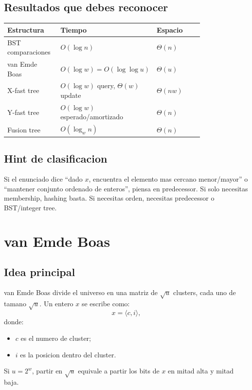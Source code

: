 \documentclass[10pt]{article}
\newcommand{\bigO}{O}
\begin{document}
\subsection{Resultados que debes reconocer}
\begin{center}
\begin{tabular}{p{0.28\linewidth}p{0.24\linewidth}p{0.28\linewidth}}
\toprule
Estructura & Tiempo & Espacio \\
\midrule
BST comparaciones & $\bigO(\log n)$ & $\Theta(n)$ \\
van Emde Boas & $\bigO(\log w)=\bigO(\log\log u)$ & $\Theta(u)$ \\
X-fast tree & $\bigO(\log w)$ query, $\Theta(w)$ update & $\Theta(nw)$ \\
Y-fast tree & $\bigO(\log w)$ esperado/amortizado & $\Theta(n)$ \\
Fusion tree & $\bigO(\log_w n)$ & $\Theta(n)$ \\
\bottomrule
\end{tabular}
\end{center}

\subsection{Hint de clasificacion}
Si el enunciado dice ``dado $x$, encuentra el elemento mas cercano menor/mayor''
o ``mantener conjunto ordenado de enteros'', piensa en predecessor. Si solo
necesitas membership, hashing basta. Si necesitas orden, necesitas predecessor o
BST/integer tree.

\newpage
\section{van Emde Boas}

\subsection{Idea principal}
van Emde Boas divide el universo en una matriz de $\sqrt u$ clusters, cada uno
de tamano $\sqrt u$. Un entero $x$ se escribe como:
\[
x=\langle c,i\rangle,
\]
donde:
\begin{itemize}[leftmargin=*]
\item $c$ es el numero de cluster;
\item $i$ es la posicion dentro del cluster.
\end{itemize}

Si $u=2^w$, partir en $\sqrt u$ equivale a partir los bits de $x$ en mitad alta
y mitad baja.
\end{document}
